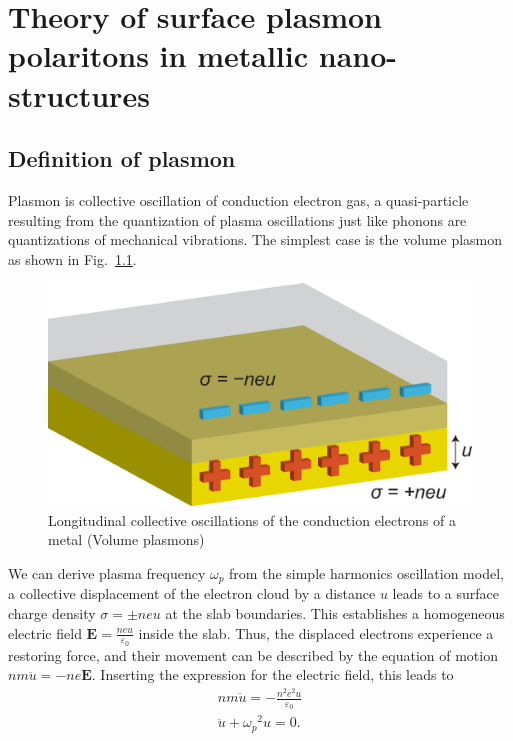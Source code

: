 \chapter{Theory of surface plasmon polaritons in metallic nano-structures}
\label{c:thm}
\section{Definition of plasmon}

Plasmon is collective oscillation of conduction electron gas, a quasi-particle resulting from the quantization of plasma oscillations just like phonons are quantizations of mechanical vibrations. The simplest case is the volume plasmon as shown in Fig.~\ref{fig:bulk}.
\begin{figure}[htb]
\centering
\includegraphics[scale=0.5]{THM/bulk.eps}
\caption{\label{fig:bulk}Longitudinal collective oscillations of the conduction electrons of a metal (Volume plasmons)}
\end{figure}
 We can derive plasma frequency $\omega_p$ from the simple harmonics oscillation model, a collective displacement of the electron cloud by a distance $u$ leads to a surface charge density $\sigma = \pm neu$ at the slab boundaries. This establishes a homogeneous electric field $\mathbf{E} = \frac{neu}{\varepsilon_0}$ inside the slab. Thus, the displaced electrons experience a restoring force, and their movement can be described by the equation of motion $nm\ddot{u} = -ne\mathbf{E}$. Inserting the expression for the electric field, this leads to
 \begin{subequations}
 \begin{align}
 nm\ddot{u} = -\frac{n^2e^2u}{\varepsilon_0} \\
 \ddot{u} + {\omega_p}^{2}u = 0\text{.}
 \end{align}
 \end{subequations}

